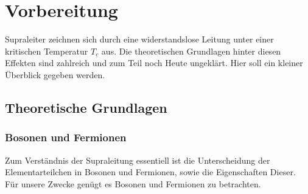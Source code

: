 \chapter{Vorbereitung}
Supraleiter zeichnen sich durch eine widerstandslose Leitung unter einer kritischen
Temperatur $T_c$ aus. Die theoretischen Grundlagen hinter 
diesen Effekten sind zahlreich und zum Teil noch Heute ungeklärt. Hier soll ein
kleiner Überblick gegeben werden.

	\section{Theoretische Grundlagen}

    \subsection{Bosonen und Fermionen}
Zum Verständnis der Supraleitung essentiell ist die Unterscheidung der 
Elementarteilchen in Bosonen und Fermionen, sowie die Eigenschaften Dieser.
Für unsere Zwecke genügt es Bosonen und Fermionen zu betrachten.

